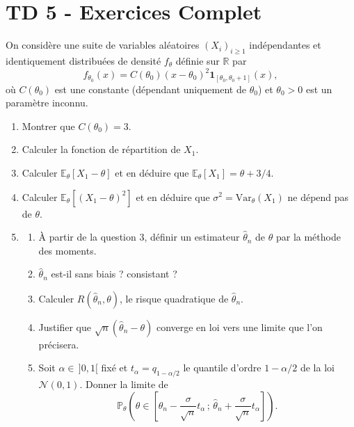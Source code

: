 \chapter*{TD 5 - Exercices Complet}

\setcounter{exercice}{0}

\begin{mdframed}
\begin{exercice}
On considère une suite de variables aléatoires $(X_i)_{i \ge 1}$ indépendantes et identiquement distribuées de densité $f_\theta$ définie sur $\mathbb{R}$ par
\begin{equation*}
f_{\theta_0}(x) = C(\theta_0)(x - \theta_0)^2 \mathbf{1}_{[\theta_0, \theta_0 + 1]} (x),
\end{equation*}
où $C(\theta_0)$ est une constante (dépendant uniquement de $\theta_0$) et $\theta_0 > 0$ est un paramètre inconnu.

\begin{enumerate}
    \item Montrer que $C(\theta_0) = 3$.
    \item Calculer la fonction de répartition de $X_1$.
    \item Calculer $\mathbb{E}_\theta[X_1 - \theta]$ et en déduire que $\mathbb{E}_\theta[X_1] = \theta + 3/4$.
    \item Calculer $\mathbb{E}_\theta[(X_1 - \theta)^2]$ et en déduire que $\sigma^2 = \text{Var}_\theta(X_1)$ ne dépend pas de $\theta$.
    \item 
    \begin{enumerate}
        \item[i--] À partir de la question 3, définir un estimateur $\hat{\theta}_n$ de $\theta$ par la méthode des moments.
        \item[ii--] $\hat{\theta}_n$ est-il sans biais ? consistant ?
        \item[iii--] Calculer $R(\hat{\theta}_n, \theta)$, le risque quadratique de $\hat{\theta}_n$.
        \item[iv--] Justifier que $\sqrt{n}(\hat{\theta}_n - \theta)$ converge en loi vers une limite que l'on précisera.
        \item[v--] Soit $\alpha \in \, ]0, 1[$ fixé et $t_\alpha = q_{1-\alpha/2}$ le quantile d'ordre $1 - \alpha/2$ de la loi $\mathcal{N}(0, 1)$. Donner la limite de
        \begin{equation*}
        \mathbb{P}_\theta \left( \theta \in \left[ \hat{\theta}_n - \frac{\sigma}{\sqrt{n}}t_\alpha \, ; \, \hat{\theta}_n + \frac{\sigma}{\sqrt{n}}t_\alpha \right] \right).
        \end{equation*}
    \end{enumerate}
    

\end{enumerate}
\end{exercice}
\end{mdframed}
